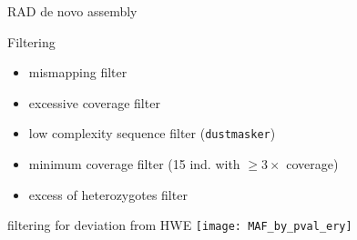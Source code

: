 \documentclass[xcolor=pdftex,dvipsnames,table, handout]{beamer}
\begin{document}
\begin{frame}{RAD de novo assembly}
\centering
{}
{}
\end{frame}
%
\begin{frame}{Filtering}
\begin{itemize}
\scriptsize
\baselineskip12pt
\item mismapping filter \\[10pt]
\item excessive coverage filter\\[10pt]
\item low complexity sequence filter (\texttt{dustmasker})\\[10pt]
\item minimum coverage filter (15 ind. with $\ge 3\times$ coverage)\\[10pt]
\item excess of heterozygotes filter
\end{itemize}
\end{frame}
%
\begin{frame}{filtering for deviation from HWE}
\centering
\texttt{[image: MAF\_by\_pval\_ery]}
\end{frame}
%
\end{document}
